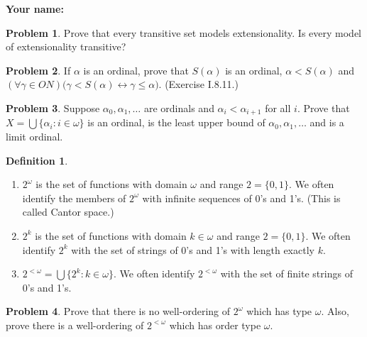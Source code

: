 \documentclass[12pt]{amsart}
\theoremstyle{definition}
\newtheorem{definition}{Definition}
\newtheorem{problem}{Problem}
\begin{document}
\begin{center}
\end{center}


\vspace{1em}

\noindent \textbf{Your name:}\\


\noindent\hrulefill

\vspace{-1.5em}

\noindent\hrulefill

\vspace{1em}




\begin{problem}
Prove that every transitive set models extensionality.  Is every model of extensionality transitive?
\end{problem}





\begin{problem}
If $\alpha$ is an ordinal, prove that $S(\alpha)$ is an ordinal, $\alpha < S(\alpha)$ and $(\forall \gamma \in ON)\big( \gamma < S(\alpha) \leftrightarrow \gamma \leq \alpha \big)$.  (Exercise I.8.11.)
\end{problem}




\begin{problem}
Suppose $\alpha_0, \alpha_1, \ldots$ are ordinals and $\alpha_i < \alpha_{i+1}$ for all $i$.  Prove that $X = \bigcup \{ \alpha_i : i \in \omega \}$ is an ordinal, is the least upper bound of $\alpha_0, \alpha_1, \ldots$ and is a limit ordinal.
\end{problem}




\begin{definition}\ 
\begin{enumerate}
\item $2^{\omega}$ is the set of functions with domain $\omega$ and range $2 = \{ 0,1 \}$.  We often identify the members of $2^{\omega}$ with infinite sequences of 0's and 1's.  (This is called Cantor space.)
\item $2^k$ is the set of functions with domain $k \in \omega$ and range $2 = \{ 0,1 \}$.  We often identify $2^k$ with the set of strings of 0's and 1's with length exactly $k$.
\item $2^{<\omega} = \bigcup \big\{ 2^k : k \in \omega \big\}$.  We often identify $2^{<\omega}$ with the set of finite strings of 0's and 1's.
\end{enumerate}
\end{definition}

\begin{problem}
Prove that there is no well-ordering of $2^{\omega}$ which has type $\omega$.  Also, prove there is a well-ordering of $2^{<\omega}$ which has order type $\omega$.
\end{problem}
\end{document}
